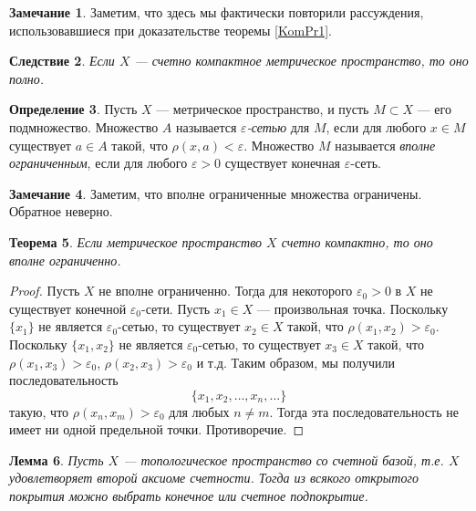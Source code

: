 \documentclass[12pt, titlepage, oneside]{amsbook}
\newtheorem{theorem}{Теорема}[chapter]
\newtheorem{lemma}[theorem]{Лемма}
\newtheorem{corollary}[theorem]{Следствие}
\theoremstyle{definition}
\newtheorem{definition}[theorem]{Определение}
\newtheorem{remark}[theorem]{Замечание}
\theoremstyle{remark}
\begin{document}
\begin{remark}
	Заметим, что здесь мы фактически повторили рассуждения, использовавшиеся при доказательстве теоремы \ref{KomPr1}.
\end{remark}

\begin{corollary}
	\label{KomPr5-1}
	Если $X$ --- счетно компактное метрическое пространство, то оно полно.
\end{corollary}

\begin{definition}
	Пусть $X$ --- метрическое пространство, и пусть $M\subset X$ --- его подмножество. Множество $A$ называется \emph{$\varepsilon$-сетью} для $M$, если для любого $x\in M$ существует $a\in A$ такой, что $\rho(x,a)<\varepsilon$. Множество $M$ называется \emph{вполне ограниченным}, если для любого $\varepsilon>0$ существует конечная $\varepsilon$-сеть.
\end{definition}

\begin{remark}
	Заметим, что вполне ограниченные множества ограничены. Обратное неверно.
\end{remark}


\begin{theorem}
	\label{KomPr6}
	Если метрическое пространство $X$ счетно компактно, то оно вполне ограниченно.
\end{theorem}

\begin{proof}
	Пусть $X$ не вполне ограниченно. Тогда для некоторого $\varepsilon_0>0$ в $X$ не существует конечной $\varepsilon_0$-сети. Пусть $x_1\in X$ --- произвольная точка. Поскольку $\{x_1\}$ не является $\varepsilon_0$-сетью, то существует $x_2\in X$ такой, что $\rho(x_1,x_2)>\varepsilon_0$. Поскольку $\{x_1,x_2\}$ не является $\varepsilon_0$-сетью, то существует $x_3\in X$ такой, что $\rho(x_1,x_3)>\varepsilon_0$, $\rho(x_2,x_3)>\varepsilon_0$ и т.д. Таким образом, мы получили последовательность $$\{x_1,x_2,\ldots,x_n,\ldots\}$$ такую, что $\rho(x_n,x_m)>\varepsilon_0$ для любых $n\neq m$. Тогда эта последовательность не имеет ни одной предельной точки. Противоречие.
\end{proof}

\begin{lemma}
	\label{LemKomPr}
	Пусть $X$ --- топологическое пространство со счетной базой, т.е. $X$ удовлетворяет второй аксиоме счетности. Тогда из всякого открытого покрытия можно выбрать конечное или счетное подпокрытие.
\end{lemma}
\end{document}
